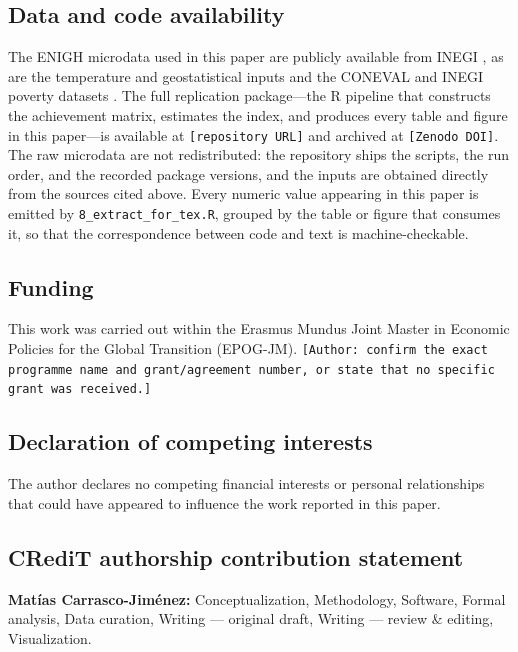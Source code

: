 \documentclass[11pt, a4paper]{article}
\begin{document}
\subsection*{Data and code availability}

The ENIGH microdata used in this paper are publicly available from INEGI \parencite{enigh2016, enigh2018, enigh2020, enigh2022, enigh2024}, as are the temperature and geostatistical inputs \parencite{temp_inegi, temp_inegi2, geo_inegi} and the CONEVAL and INEGI poverty datasets \parencite{coneval_data, pm_inegi_2025}. The full replication package---the R pipeline that constructs the achievement matrix, estimates the index, and produces every table and figure in this paper---is available at \texttt{[repository URL]} and archived at \texttt{[Zenodo DOI]}. The raw microdata are not redistributed: the repository ships the scripts, the run order, and the recorded package versions, and the inputs are obtained directly from the sources cited above. Every numeric value appearing in this paper is emitted by \texttt{8\_extract\_for\_tex.R}, grouped by the table or figure that consumes it, so that the correspondence between code and text is machine-checkable.

\subsection*{Funding}

This work was carried out within the Erasmus Mundus Joint Master in Economic Policies for the Global Transition (EPOG-JM). \texttt{[Author: confirm the exact programme name and grant/agreement number, or state that no specific grant was received.]}

\subsection*{Declaration of competing interests}

The author declares no competing financial interests or personal relationships that could have appeared to influence the work reported in this paper.

\subsection*{CRediT authorship contribution statement}

\textbf{Matías Carrasco-Jiménez:} Conceptualization, Methodology, Software, Formal analysis, Data curation, Writing --- original draft, Writing --- review \& editing, Visualization.
\end{document}
